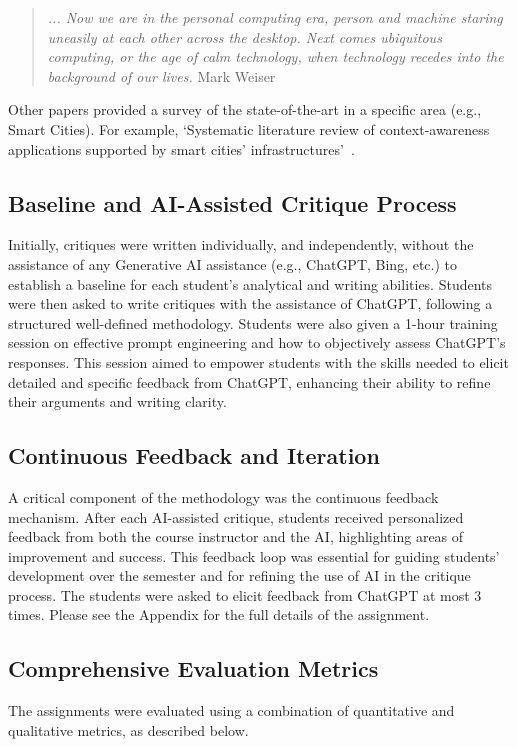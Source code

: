 \begin{quotation}
\textit{... Now we are in the personal computing era, person and machine staring uneasily at each other across the desktop. Next comes ubiquitous computing, or the age of calm technology, when technology recedes into the background of our lives.}
\textemdash Mark Weiser
\end{quotation}

Other papers provided a survey of the state-of-the-art in a specific area (e.g., Smart Cities).  For example, `Systematic literature review of context-awareness applications supported by smart cities’ infrastructures'~\cite{Rocha_2022_SmartCities}.

\subsection{Baseline and AI-Assisted Critique Process}
Initially, critiques were written individually, and independently, without the assistance of any Generative AI assistance (e.g., ChatGPT, Bing, etc.) to establish a baseline for each student's analytical and writing abilities. Students were then asked to write critiques with the assistance of ChatGPT, following a structured well-defined methodology.  Students were also given a 1-hour training session on effective prompt engineering and how to objectively assess ChatGPT's responses. This session aimed to empower students with the skills needed to elicit detailed and specific feedback from ChatGPT, enhancing their ability to refine their arguments and writing clarity. 

\subsection{Continuous Feedback and Iteration}
A critical component of the methodology was the continuous feedback mechanism. After each AI-assisted critique, students received personalized feedback from both the course instructor and the AI, highlighting areas of improvement and success. This feedback loop was essential for guiding students' development over the semester and for refining the use of AI in the critique process.  The students were asked to elicit feedback from ChatGPT at most 3 times.  Please see the Appendix for the full details of the assignment.

\subsection{Comprehensive Evaluation Metrics}
The assignments were evaluated using a combination of quantitative and qualitative metrics, as described below.

